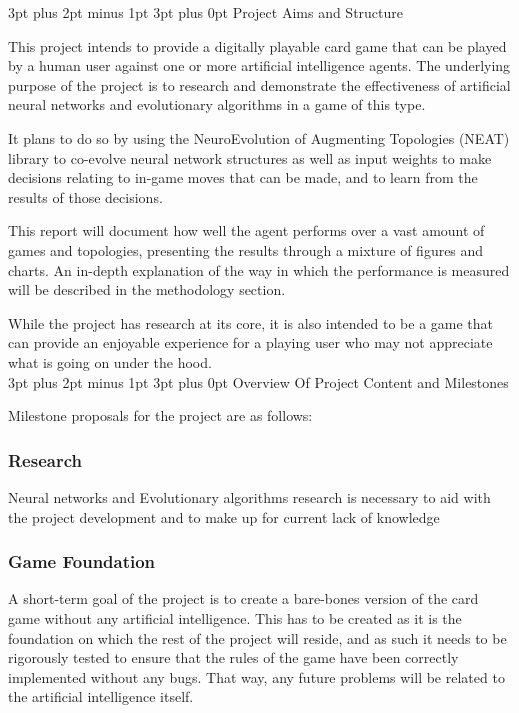 \documentclass[12pt,a4paper]{article}
\makeatletter
\renewcommand\subsection{\@startsection {subsection}{1}{2mm} %
                               {3pt plus 2pt minus 1pt} %
                               {3pt plus 0pt} %
                               {\normalfont\bfseries}}
\makeatother
\begin{document}
\subsection{Project Aims and Structure}

This project intends to provide a digitally playable card game that can be played by a human user against one or more artificial intelligence agents. The underlying purpose of the project is to research and demonstrate the effectiveness of artificial neural networks and evolutionary algorithms in a game of this type. 

It plans to do so by using the NeuroEvolution of Augmenting Topologies (NEAT) library to co-evolve neural network structures as well as input weights to make decisions relating to in-game moves that can be made, and to learn from the results of those decisions. 

This report will document how well the agent performs over a vast amount of games and topologies, presenting the results through a mixture of figures and charts. An in-depth explanation of the way in which the performance is measured will be described in the methodology section. 

While the project has research at its core, it is also intended to be a game that can provide an enjoyable experience for a playing user who may not appreciate what is going on under the hood.\\

 \subsection{Overview Of Project Content and Milestones}

Milestone proposals for the project are as follows: 
\subsubsection{Research}
Neural networks and Evolutionary algorithms research is necessary to aid with the project development and to make up for current lack of knowledge

\subsubsection{Game Foundation}
A short-term goal of the project is to create a bare-bones version of the card game without any artificial intelligence. This has to be created as it is the foundation on which the rest of the project will reside, and as such it needs to be rigorously tested to ensure that the rules of the game have been correctly implemented without any bugs. That way, any future problems will be related to the artificial intelligence itself.
\end{document}
